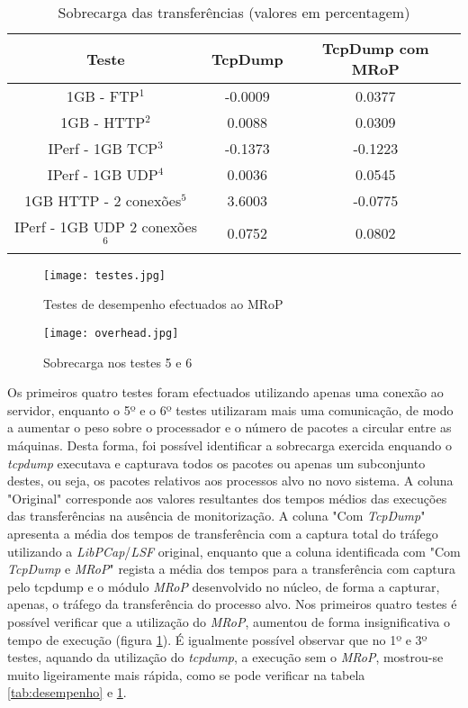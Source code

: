 \begin{table}[!htb]
\begin{center}
\caption{Sobrecarga das transferências (valores em percentagem)}
\begin{tabular}{ | c | c | c |}
\hline
Teste & \hspace {0.3cm} TcpDump \hspace {0.3cm} & TcpDump com MRoP  \\

\hline
1GB - FTP$^{1}$ & -0.0009  & 0.0377  \\
1GB - HTTP$^{2}$ & 0.0088 &  0.0309   \\
IPerf - 1GB TCP$^{3}$ & -0.1373 &  -0.1223   \\
IPerf - 1GB UDP$^{4}$ & 0.0036 & 0.0545 \\
\hline
\hline
1GB HTTP - 2 conexões$^{5}$ & 3.6003 & -0.0775   \\
IPerf - 1GB UDP 2 conexões$^{6}$ & 0.0752 & 0.0802   \\
\hline
\end{tabular}
\label{tab:overhead}
\end{center}
\end{table}

\begin{figure}[!ht]
\centering
\texttt{[image: testes.jpg]}
\caption{Testes de desempenho efectuados ao MRoP}
\label{fig:tests_graphics}
\end{figure}

\begin{figure}[!ht]
\centering
\texttt{[image: overhead.jpg]}
\caption{Sobrecarga nos testes 5 e 6 }
\label{fig:tests_overhead}
\end{figure}

Os primeiros quatro testes foram efectuados utilizando apenas uma conexão ao servidor, enquanto o 5º e o 6º testes utilizaram mais uma comunicação, de modo a aumentar o peso sobre o processador e o número de pacotes a circular entre as máquinas.
Desta forma, foi possível identificar a sobrecarga exercida enquando o \textit{tcpdump} executava e capturava todos os pacotes ou apenas um subconjunto destes, ou seja, os pacotes relativos aos processos alvo no novo sistema.
A coluna "Original" corresponde aos valores resultantes dos tempos médios das execuções das transferências na ausência de monitorização.
A coluna "Com \textit{TcpDump}" apresenta a média dos tempos de transferência com a captura total do tráfego utilizando a \textit{LibPCap}/\textit{LSF} original, enquanto que a coluna identificada com "Com \textit{TcpDump} e \textit{MRoP}" regista a média dos tempos para a transferência com captura pelo tcpdump e o módulo \textit{MRoP} desenvolvido no núcleo, de forma a capturar, apenas, o tráfego da transferência do processo alvo.
Nos primeiros quatro testes é possível verificar que a utilização do \textit{MRoP}, aumentou de forma insignificativa o tempo de execução (figura \ref{fig:tests_graphics}).
É igualmente possível observar que no 1º e 3º testes, aquando da utilização do \textit{tcpdump}, a execução sem o \textit{MRoP}, mostrou-se muito ligeiramente mais rápida, como se pode verificar na tabela \ref{tab:desempenho} e \ref{tab:overhead}.


